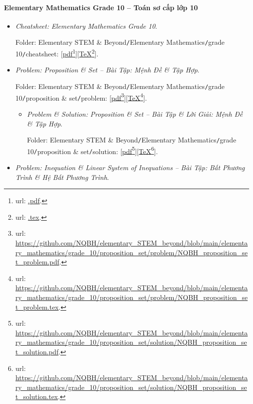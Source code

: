 \documentclass[12pt]{article}
\begin{document}
\paragraph{Elementary Mathematics Grade 10 -- Toán sơ cấp lớp 10}

\begin{itemize}
	\item {\it Cheatsheet: Elementary Mathematics Grade 10}.
	
	Folder: {\sf Elementary STEM \& Beyond{\tt/}Elementary Mathematics{\tt/}grade 10{\tt/}cheatsheet}: [\href{.pdf}{pdf}\footnote{{\sc url}: \url{.pdf}.}][\href{.tex}{\TeX}\footnote{{\sc url}: \url{.tex}.}].
	\item {\it Problem: Proposition \& Set -- Bài Tập: Mệnh Đề \& Tập Hợp}.
	
	Folder: {\sf Elementary STEM \& Beyond{\tt/}Elementary Mathematics{\tt/}grade 10{\tt/}proposition \& set{\tt/}problem}: [\href{https://github.com/NQBH/elementary_STEM_beyond/blob/main/elementary_mathematics/grade_10/proposition_set/problem/NQBH_proposition_set_problem.pdf}{pdf}\footnote{{\sc url}: \url{https://github.com/NQBH/elementary_STEM_beyond/blob/main/elementary_mathematics/grade_10/proposition_set/problem/NQBH_proposition_set_problem.pdf}.}][\href{https://github.com/NQBH/elementary_STEM_beyond/blob/main/elementary_mathematics/grade_10/proposition_set/problem/NQBH_proposition_set_problem.tex}{\TeX}\footnote{{\sc url}: \url{https://github.com/NQBH/elementary_STEM_beyond/blob/main/elementary_mathematics/grade_10/proposition_set/problem/NQBH_proposition_set_problem.tex}.}].
	\begin{itemize}
		\item {\it Problem \& Solution: Proposition \& Set -- Bài Tập \& Lời Giải: Mệnh Đề \& Tập Hợp}.
		
		Folder: {\sf Elementary STEM \& Beyond{\tt/}Elementary Mathematics{\tt/}grade 10{\tt/}proposition \& set{\tt/}solution}: [\href{https://github.com/NQBH/elementary_STEM_beyond/blob/main/elementary_mathematics/grade_10/proposition_set/solution/NQBH_proposition_set_solution.pdf}{pdf}\footnote{{\sc url}: \url{https://github.com/NQBH/elementary_STEM_beyond/blob/main/elementary_mathematics/grade_10/proposition_set/solution/NQBH_proposition_set_solution.pdf}.}][\href{https://github.com/NQBH/elementary_STEM_beyond/blob/main/elementary_mathematics/grade_10/proposition_set/solution/NQBH_proposition_set_solution.tex}{\TeX}\footnote{{\sc url}: \url{https://github.com/NQBH/elementary_STEM_beyond/blob/main/elementary_mathematics/grade_10/proposition_set/solution/NQBH_proposition_set_solution.tex}.}].
	\end{itemize}
	\item {\it Problem: Inequation \& Linear System of Inequations -- Bài Tập: Bất Phương Trình \& Hệ Bất Phương Trình}.
	

\end{itemize}
\end{document}
